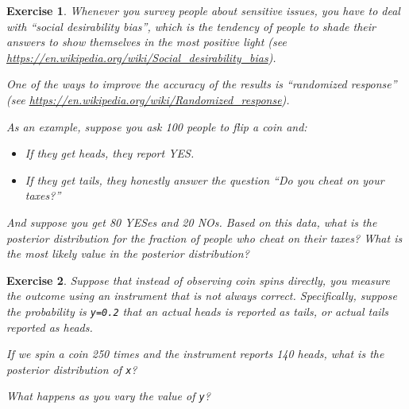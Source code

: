 \documentclass[12pt]{book}
\theoremstyle{exercise}
\newtheorem{exercise}{Exercise}[chapter]
\newcommand{\py}[1]{{\tt #1}}%
\begin{document}
\begin{exercise}
Whenever you survey people about sensitive issues, you have to deal with ``social desirability bias'', which is the tendency of people to shade their answers to show themselves in the most positive light (see \url{https://en.wikipedia.org/wiki/Social_desirability_bias}).

One of the ways to improve the accuracy of the results is ``randomized response'' (see \url{https://en.wikipedia.org/wiki/Randomized_response}).

As an example, suppose you ask 100 people to flip a coin and:

\begin{itemize}

\item If they get heads, they report YES.

\item If they get tails, they honestly answer the question ``Do you cheat on your taxes?''

\end{itemize}

And suppose you get 80 YESes and 20 NOs.  Based on this data, what is the posterior distribution for the fraction of people who cheat on their taxes?  What is the most likely value in the posterior distribution?
\end{exercise}


\begin{exercise}
Suppose that instead of observing coin spins directly, you measure the outcome using an instrument that is not always correct.  Specifically, suppose the probability is \py{y=0.2} that an actual heads is reported
as tails, or actual tails reported as heads.

If we spin a coin 250 times and the instrument reports 140 heads, what is the posterior distribution of \py{x}?

What happens as you vary the value of \py{y}?
\end{exercise}
\end{document}
